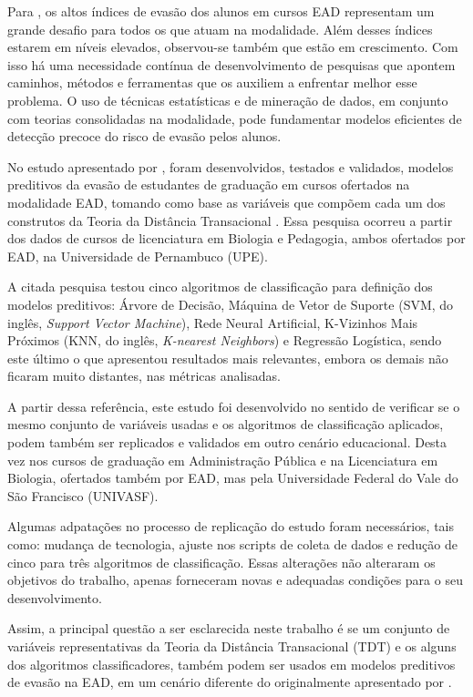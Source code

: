Para , os altos índices de evasão dos alunos em
cursos EAD representam um grande desafio para todos os que atuam na modalidade.
Além desses índices estarem em níveis elevados, observou-se também que estão em
crescimento. Com isso há uma necessidade contínua de desenvolvimento de
pesquisas que apontem caminhos, métodos e ferramentas que os auxiliem a
enfrentar melhor esse problema. O uso de técnicas estatísticas e de mineração de
dados, em conjunto com teorias consolidadas na modalidade, pode fundamentar
modelos eficientes de detecção precoce do risco de evasão pelos alunos.

No estudo apresentado por , foram desenvolvidos,
testados e validados, modelos preditivos da evasão de estudantes de graduação em
cursos ofertados na modalidade EAD, tomando como base as variáveis que compõem
cada um dos construtos da Teoria da Distância Transacional
\cite{moore2008teoria}. Essa pesquisa ocorreu a partir dos dados de cursos de
licenciatura em Biologia e Pedagogia, ambos ofertados por EAD, na Universidade
de Pernambuco (UPE).

A citada pesquisa testou cinco algoritmos de classificação para definição dos
modelos preditivos: Árvore de Decisão, Máquina de Vetor de Suporte (SVM, do inglês, \textit{Support Vector Machine}), Rede
Neural Artificial, K-Vizinhos Mais Próximos (KNN, do inglês, \textit{K-nearest
Neighbors}) e Regressão Logística, sendo este último o que apresentou resultados
mais relevantes, embora os demais não ficaram muito distantes, nas métricas
analisadas.

A partir dessa referência, este estudo foi desenvolvido no sentido de verificar
se o mesmo conjunto de variáveis usadas e os algoritmos de classificação
aplicados, podem também ser replicados e validados em outro cenário educacional.
Desta vez nos cursos de graduação em Administração Pública e na Licenciatura em
Biologia, ofertados também por EAD, mas pela Universidade Federal do Vale do São
Francisco (UNIVASF).

Algumas adpatações no processo de replicação do estudo foram necessários, tais
como: mudança de tecnologia, ajuste nos scripts de coleta de dados e redução de
cinco para três algoritmos de classificação. Essas alterações não alteraram os
objetivos do trabalho, apenas forneceram novas e adequadas condições para o seu
desenvolvimento.

Assim, a principal questão a ser esclarecida neste trabalho é se um conjunto de
variáveis representativas da Teoria da Distância Transacional (TDT) e os alguns
dos algoritmos classificadores, também podem ser usados em modelos preditivos de
evasão na EAD, em um cenário diferente do originalmente apresentado por
.


